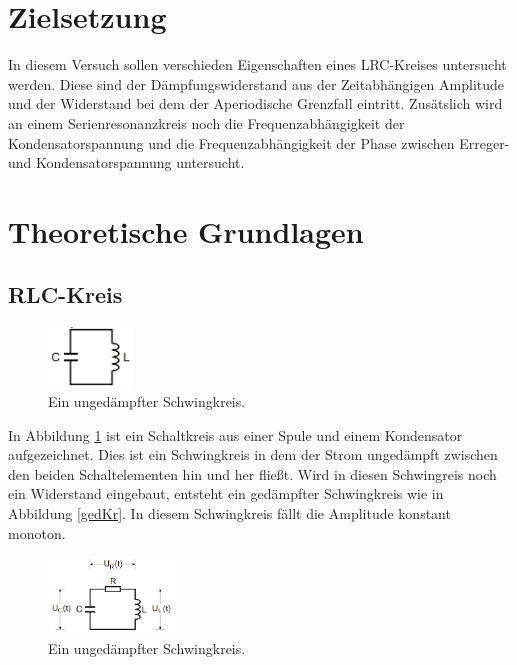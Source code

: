 \section{Zielsetzung}
    \noindent In diesem Versuch sollen verschieden Eigenschaften eines LRC-Kreises untersucht werden. Diese sind der Dämpfungswiderstand aus der 
    Zeitabhängigen Amplitude und der Widerstand bei dem der Aperiodische Grenzfall eintritt. Zusätslich wird an einem
    Serienresonanzkreis noch die Frequenzabhängigkeit der Kondensatorspannung und die Frequenzabhängigkeit der Phase zwischen Erreger- und 
    Kondensatorspannung untersucht.
   

\section{Theoretische Grundlagen}


    \subsection{RLC-Kreis}


    \begin{figure}[H]
        \centering
        \includegraphics[width=0.2\textwidth]{images/unged.PNG}
        \caption{Ein ungedämpfter Schwingkreis.}
        \label{img:unged}
    \end{figure}

    \noindent In Abbildung \ref{img:unged} ist ein Schaltkreis aus einer Spule und einem Kondensator aufgezeichnet. Dies ist ein Schwingkreis 
    in dem der Strom ungedämpft zwischen den beiden Schaltelementen hin und her fließt. Wird in diesen Schwingreis noch ein Widerstand eingebaut, 
    entsteht ein gedämpfter Schwingkreis wie in Abbildung \ref{gedKr}. In diesem Schwingkreis fällt die Amplitude konstant monoton.
    
    \begin{figure}[H]
        \centering
        \includegraphics[width=0.3\textwidth]{images/gedKr.PNG}
        \caption{Ein ungedämpfter Schwingkreis.}
        \label{img:gedKr}
    \end{figure}
    

